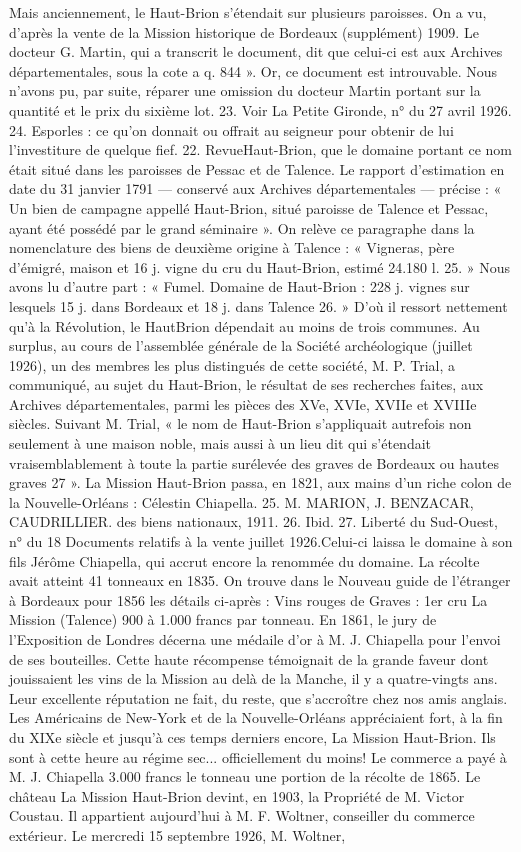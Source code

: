 Mais anciennement, le Haut-Brion s'étendait sur plusieurs paroisses. On a vu, d'après la vente de la Mission historique de Bordeaux (supplément) 1909. Le docteur G. Martin, qui a transcrit le document, dit que celui-ci est aux Archives départementales, sous la cote a q. 844 ». Or, ce document est introuvable. Nous n'avons pu, par suite, réparer une omission du docteur Martin portant sur la quantité et le prix du sixième lot. 23. Voir La Petite Gironde, n° du 27 avril 1926. 24. Esporles : ce qu'on donnait ou offrait au seigneur pour obtenir de lui l'investiture de quelque fief. 22. RevueHaut-Brion, que le domaine portant ce nom était situé dans les paroisses de Pessac et de Talence. Le rapport d'estimation en date du 31 janvier 1791 — conservé aux Archives départementales — précise : « Un bien de campagne appellé Haut-Brion, situé paroisse de Talence et Pessac, ayant été possédé par le grand séminaire ». On relève ce paragraphe dans la nomenclature des biens de deuxième origine à Talence : « Vigneras, père d'émigré, maison et 16 j. vigne du cru du Haut-Brion, estimé 24.180 l. 25. » Nous avons lu d'autre part : « Fumel. Domaine de Haut-Brion : 228 j. vignes sur lesquels 15 j. dans Bordeaux et 18 j. dans Talence 26. » D'où il ressort nettement qu'à la Révolution, le HautBrion dépendait au moins de trois communes. Au surplus, au cours de l'assemblée générale de la Société archéologique (juillet 1926), un des membres les plus distingués de cette société, M. P. Trial, a communiqué, au sujet du Haut-Brion, le résultat de ses recherches faites, aux Archives départementales, parmi les pièces des XVe, XVIe, XVIIe et XVIIIe siècles. Suivant M. Trial, « le nom de Haut-Brion s'appliquait autrefois non seulement à une maison noble, mais aussi à un lieu dit qui s'étendait vraisemblablement à toute la partie surélevée des graves de Bordeaux ou hautes graves 27 ». La Mission Haut-Brion passa, en 1821, aux mains d'un riche colon de la Nouvelle-Orléans : Célestin Chiapella. 25. M. MARION, J. BENZACAR, CAUDRILLIER. des biens nationaux, 1911. 26. Ibid. 27. Liberté du Sud-Ouest, n° du 18 Documents relatifs à la vente juillet 1926.Celui-ci laissa le domaine à son fils Jérôme Chiapella, qui accrut encore la renommée du domaine. La récolte avait atteint 41 tonneaux en 1835. On trouve dans le Nouveau guide de l'étranger à Bordeaux pour 1856 les détails ci-après : Vins rouges de Graves : 1er cru La Mission (Talence) 900 à 1.000 francs par tonneau. En 1861, le jury de l'Exposition de Londres décerna une médaile d'or à M. J. Chiapella pour l'envoi de ses bouteilles. Cette haute récompense témoignait de la grande faveur dont jouissaient les vins de la Mission au delà de la Manche, il y a quatre-vingts ans. Leur excellente réputation ne fait, du reste, que s'accroître chez nos amis anglais. Les Américains de New-York et de la Nouvelle-Orléans appréciaient fort, à la fin du XIXe siècle et jusqu'à ces temps derniers encore, La Mission Haut-Brion. Ils sont à cette heure au régime sec... officiellement du moins! Le commerce a payé à M. J. Chiapella 3.000 francs le tonneau une portion de la récolte de 1865. Le château La Mission Haut-Brion devint, en 1903, la Propriété de M. Victor Coustau. Il appartient aujourd'hui à M. F. Woltner, conseiller du commerce extérieur. Le mercredi 15 septembre 1926, M. Woltner, 